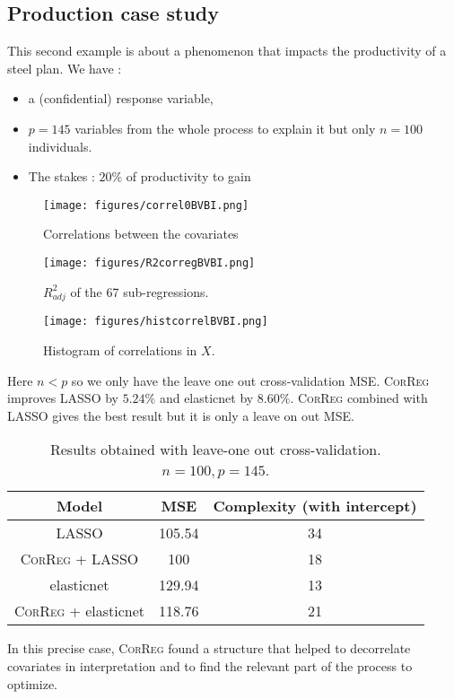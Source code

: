 \documentclass[11pt,a4paper]{article}
\begin{document}
		\subsection{Production case study}
This second example is about a phenomenon that impacts the productivity of a steel plan.
We have :
		\begin{itemize}
			\item a (confidential)  response variable,
			\item $p=145$ variables from the whole process to explain it but only $n=100$ individuals.
			\item The stakes : $20\%$ of productivity to gain
		\end{itemize}
		
\begin{figure}[h!]
	\begin{minipage}[l]{.30\linewidth}
			\texttt{[image: figures/correl0BVBI.png]} 
			\caption{Correlations between the covariates}
	\end{minipage} \hfill
	\begin{minipage}[c]{.30\linewidth}
			\texttt{[image: figures/R2corregBVBI.png]} 
			\caption{$R^2_{adj}$ of the 67 sub-regressions.}
	\end{minipage} \hfill
   \begin{minipage}[r]{.30\linewidth}
			\texttt{[image: figures/histcorrelBVBI.png]} 
			\caption{Histogram of correlations in $X$.} 
   \end{minipage}
\end{figure}   			
	Here $n<p$ so we only have the leave one out cross-validation MSE.
	\textsc{CorReg} improves LASSO by $5.24\%$ and elasticnet by $8.60\%$. \textsc{CorReg} combined with LASSO gives the best result but it is only a leave on out MSE.
\begin{table}[h!]
\centering
\begin{tabular}{|c|c|c|}
	\hline 
	Model & MSE & Complexity (with intercept) \\ 
	\hline 
	LASSO & 105.54 & 34 \\ 
	\hline 
	\textsc{CorReg} + LASSO & 100 & 18 \\ 
	\hline 
	elasticnet & 129.94 & 13 \\ 
	\hline 
	\textsc{CorReg} + elasticnet & 118.76 & 21 \\ 
	\hline 
\end{tabular} 
\caption{Results obtained with leave-one out cross-validation. $n=100, p=145$.}	
\end{table}
In this precise case, \textsc{CorReg} found a structure that helped to decorrelate covariates in interpretation and to find the relevant part of the process to optimize.
\end{document}
